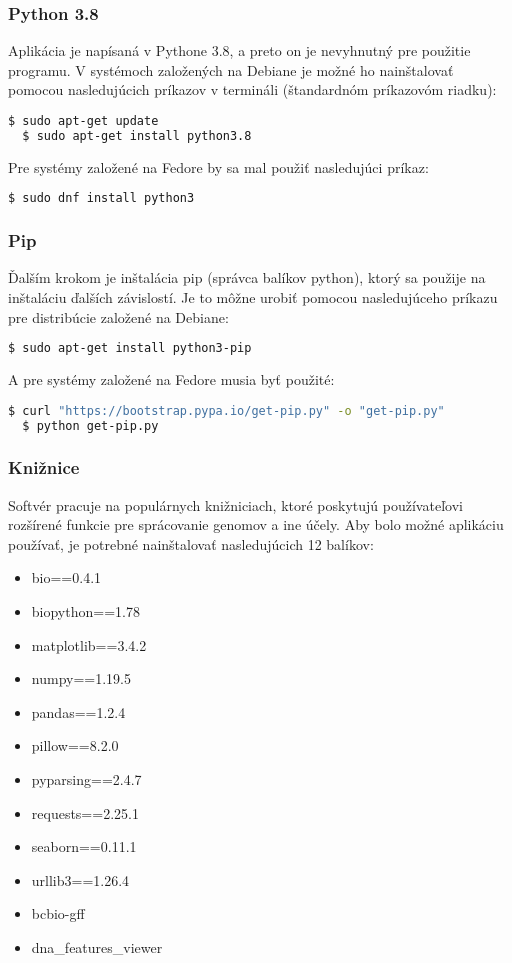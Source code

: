\subsubsection{Python 3.8}
Aplikácia je napísaná v Pythone 3.8, a preto on je nevyhnutný pre použitie programu.
V systémoch založených na Debiane je možné ho nainštalovať pomocou nasledujúcich príkazov v termináli (štandardnóm príkazovóm riadku):
\begin{lstlisting}[language=bash]
  $ sudo apt-get update
  $ sudo apt-get install python3.8
\end{lstlisting}

Pre systémy založené na Fedore by sa mal použiť nasledujúci príkaz:
\begin{lstlisting}[language=bash]
  $ sudo dnf install python3
\end{lstlisting}


\subsubsection{Pip}
Ďalším krokom je inštalácia {\selectfont pip} (správca balíkov python), ktorý sa použije na inštaláciu ďalších závislostí.
Je to môžne urobiť pomocou nasledujúceho príkazu pre distribúcie založené na Debiane:
\begin{lstlisting}[language=bash]
  $ sudo apt-get install python3-pip
\end{lstlisting}

A pre systémy založené na Fedore musia byť použité:
\begin{lstlisting}[language=bash]
  $ curl "https://bootstrap.pypa.io/get-pip.py" -o "get-pip.py"
  $ python get-pip.py
\end{lstlisting}


\subsubsection{Knižnice}
Softvér pracuje na populárnych knižniciach, ktoré poskytujú používateľovi rozšírené funkcie pre sprácovanie genomov a ine účely.
Aby bolo možné aplikáciu používať, je potrebné nainštalovať nasledujúcich 12 balíkov:
{\selectfont
\begin{itemize}
    \item bio==0.4.1
    \item biopython==1.78
    \item matplotlib==3.4.2
    \item numpy==1.19.5
    \item pandas==1.2.4
    \item pillow==8.2.0
    \item pyparsing==2.4.7
    \item requests==2.25.1
    \item seaborn==0.11.1
    \item urllib3==1.26.4
    \item bcbio-gff
    \item dna\_features\_viewer
\end{itemize}
}

